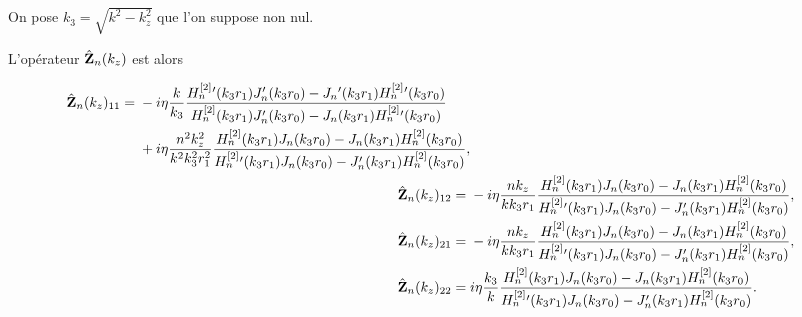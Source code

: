               On pose \(k_3 = \sqrt{k^2 - k_z^2}\) que l'on suppose non nul.





              L'opérateur \(\hat{\mathbf{Z}}_n(k_z)\) est alors

              \newcommand{\Sni}{\frac{
                H^{[2]}_n{}'(k_3r_1)J_n'(k_3r_0)-J_n{}'(k_3r_1)H^{[2]}_n{}'(k_3r_0)
              }{
                H^{[2]}_n(k_3r_1)J_n'(k_3r_0)-J_n(k_3r_1)H^{[2]}_n{}'(k_3r_0)
              }}

              \newcommand{\Tni}{\frac{
                H^{[2]}_n(k_3r_1)J_n(k_3r_0)-J_n(k_3r_1)H^{[2]}_n(k_3r_0)
              }{
                H^{[2]}_n{}'(k_3r_1)J_n(k_3r_0)-J_n'(k_3r_1)H^{[2]}_n(k_3r_0)
              }}

              \begin{align*}
                \begin{split}
                  \hat\mZ_n(k_z)_{11} ={}& - i\eta\frac{k}{k_3}\Sni
                  \\
                  {}& + i\eta\frac{n^2k_z^2}{k^2k_3^2r_1^2}\Tni,
                \end{split}
                \\
                \hat\mZ_n(k_z)_{12} ={}& -i\eta\frac{nk_z}{kk_3r_1}\Tni,
                \\
                \hat\mZ_n(k_z)_{21} ={}& -i\eta\frac{nk_z}{kk_3r_1}\Tni,
                \\
                \hat\mZ_n(k_z)_{22} ={}& i\eta\frac{k_3}{k}\Tni.
              \end{align*}




